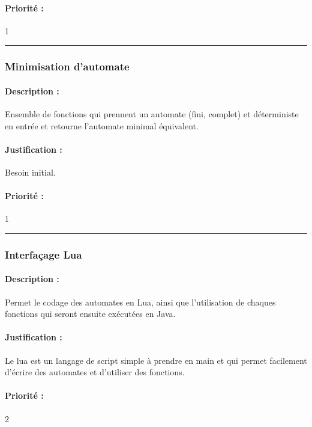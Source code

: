 \documentclass{article}%
\begin{document}
\paragraph{Priorité :} 1\\

\rule{\linewidth}{1pt}

\subsubsection{Minimisation d'automate}

\paragraph{Description :} Ensemble de fonctions qui prennent un automate (fini, complet) et déterministe en entrée et retourne l'automate minimal équivalent.

\paragraph{Justification :} Besoin initial.

\paragraph{Priorité :} 1\\

\rule{\linewidth}{1pt}

\subsubsection{Interfaçage Lua}

\paragraph{Description :} Permet le codage des automates en Lua, ainsi que l'utilisation de chaques fonctions qui seront ensuite exécutées en Java.

\paragraph{Justification :} Le lua est un langage de script simple à prendre en main et qui permet facilement d'écrire des automates et d'utiliser des fonctions.

\paragraph{Priorité :} 2\\
\end{document}
